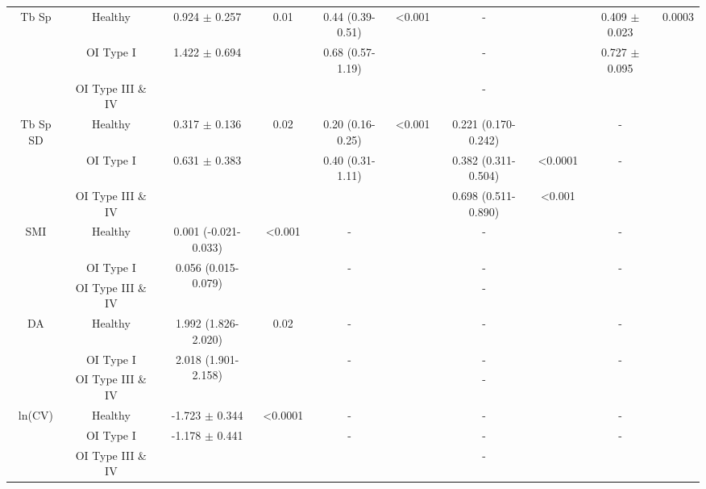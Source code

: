 \documentclass[a4paper,fleqn]{DC_ArtStyle}
\begin{document}
\begin{sidewaystable*}
\begin{tabular}{cccccccccc}
		\multirow{3}{*}{Tb Sp} & Healthy & 0.924 $\pm$ 0.257 & 0.01 & 0.44 (0.39-0.51) & <0.001 & - & & 0.409 $\pm$ 0.023 & 0.0003 \\
		& OI Type I & \multirow{2}{*}{1.422 $\pm$ 0.694} &  & 0.68 (0.57-1.19) &  & - &  & \multirow{2}{*}{0.727 $\pm$ 0.095} & \\
		&  OI Type III \& IV & & & & & - &  & & \\[3ex]
		
		\multirow{3}{*}{Tb Sp SD} & Healthy & 0.317 $\pm$ 0.136 & 0.02 & 0.20 (0.16-0.25) & <0.001 & 0.221 (0.170-0.242) & & - &  \\
		& OI Type I & \multirow{2}{*}{0.631 $\pm$ 0.383} &  & 0.40 (0.31-1.11) &  & 0.382 (0.311-0.504) & <0.0001 & - & \\
		&  OI Type III \& IV & & & & & 0.698 (0.511-0.890) & <0.001 & & \\[3ex]
		
		\multirow{3}{*}{SMI} & Healthy & 0.001 (-0.021-0.033) & <0.001 & - &  & - & & - &  \\
		& OI Type I & \multirow{2}{*}{0.056 (0.015-0.079)} &  & - &  & - &  & - & \\
		&  OI Type III \& IV & & & & & - &  & & \\[3ex]
		
		\multirow{3}{*}{DA} & Healthy & 1.992 (1.826-2.020) & 0.02 & - &  & - & & - &  \\
		& OI Type I & \multirow{2}{*}{2.018 (1.901-2.158)} &  & - &  & - &  & - & \\
		&  OI Type III \& IV & & & & & - &  & & \\[3ex]
		
		\multirow{3}{*}{ln(CV)} & Healthy & -1.723 $\pm$ 0.344 & <0.0001 & - &  & - & & - &  \\
		& OI Type I & \multirow{2}{*}{-1.178 $\pm$ 0.441} &  & - &  & - &  & - & \\
		&  OI Type III \& IV & & & & & - &  & & \\
		
		\bottomrule
	\end{tabular}
\end{sidewaystable*}
\end{document}
